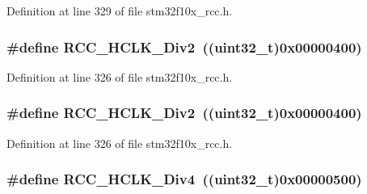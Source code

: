 Definition at line 329 of file stm32f10x\+\_\+rcc.\+h.

\subsubsection[{\texorpdfstring{R\+C\+C\+\_\+\+H\+C\+L\+K\+\_\+\+Div2}{RCC_HCLK_Div2}}]{\setlength{\rightskip}{0pt plus 5cm}\#define R\+C\+C\+\_\+\+H\+C\+L\+K\+\_\+\+Div2~(({\bf uint32\+\_\+t})0x00000400)}\hypertarget{group___a_p_b1___a_p_b2__clock__source_ga177bb3648def9a961c16f93f15ca0f62}{}\label{group___a_p_b1___a_p_b2__clock__source_ga177bb3648def9a961c16f93f15ca0f62}


Definition at line 326 of file stm32f10x\+\_\+rcc.\+h.

\subsubsection[{\texorpdfstring{R\+C\+C\+\_\+\+H\+C\+L\+K\+\_\+\+Div2}{RCC_HCLK_Div2}}]{\setlength{\rightskip}{0pt plus 5cm}\#define R\+C\+C\+\_\+\+H\+C\+L\+K\+\_\+\+Div2~(({\bf uint32\+\_\+t})0x00000400)}\hypertarget{group___a_p_b1___a_p_b2__clock__source_ga177bb3648def9a961c16f93f15ca0f62}{}\label{group___a_p_b1___a_p_b2__clock__source_ga177bb3648def9a961c16f93f15ca0f62}


Definition at line 326 of file stm32f10x\+\_\+rcc.\+h.

\subsubsection[{\texorpdfstring{R\+C\+C\+\_\+\+H\+C\+L\+K\+\_\+\+Div4}{RCC_HCLK_Div4}}]{\setlength{\rightskip}{0pt plus 5cm}\#define R\+C\+C\+\_\+\+H\+C\+L\+K\+\_\+\+Div4~(({\bf uint32\+\_\+t})0x00000500)}\hypertarget{group___a_p_b1___a_p_b2__clock__source_gafd8cf0e32a3ea5648cdc054766bc2017}{}\label{group___a_p_b1___a_p_b2__clock__source_gafd8cf0e32a3ea5648cdc054766bc2017}


